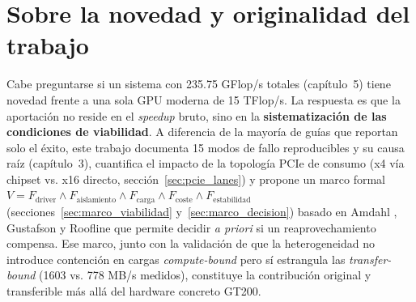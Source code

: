 \section*{Sobre la novedad y originalidad del trabajo}

Cabe preguntarse si un sistema con 235.75 GFlop/s totales (capítulo~5) tiene novedad frente a una sola GPU moderna de 15 TFlop/s. La respuesta es que la aportación no reside en el \textit{speedup} bruto, sino en la \textbf{sistematización de las condiciones de viabilidad}. A diferencia de la mayoría de guías que reportan solo el éxito, este trabajo documenta 15 modos de fallo reproducibles y su causa raíz (capítulo~3), cuantifica el impacto de la topología PCIe de consumo (x4 vía chipset vs. x16 directo, sección~\ref{sec:pcie_lanes}) y propone un marco formal $V = F_{\text{driver}} \land F_{\text{aislamiento}} \land F_{\text{carga}} \land F_{\text{coste}} \land F_{\text{estabilidad}}$ (secciones~\ref{sec:marco_viabilidad} y~\ref{sec:marco_decision}) basado en Amdahl \cite{amdahl1967}, Gustafson \cite{gustafson1988} y Roofline \cite{williams2009roofline} que permite decidir \textit{a priori} si un reaprovechamiento compensa. Ese marco, junto con la validación de que la heterogeneidad no introduce contención en cargas \textit{compute-bound} pero sí estrangula las \textit{transfer-bound} (1603 vs. 778 MB/s medidos), constituye la contribución original y transferible más allá del hardware concreto GT200.

